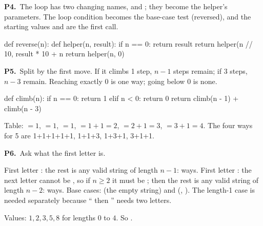 \documentclass[10pt]{scrartcl}
\begin{document}
\begin{prob}\textbf{P4.}\ The loop has two changing names,  and ; they become the helper's parameters. The loop condition  becomes the base-case test (reversed), and the starting values  and  are the first call.
\begin{py}
def reverse(n):
    def helper(n, result):
        if n == 0:
            return result
        return helper(n // 10, result * 10 + n %
    return helper(n, 0)
\end{py}
\end{prob}

\begin{prob}\textbf{P5.}\ Split by the first move. If it climbs 1 step, $n-1$ steps remain; if 3 steps, $n-3$ remain. Reaching exactly 0 is one way; going below 0 is none.
\begin{py}
def climb(n):
    if n == 0:
        return 1
    elif n < 0:
        return 0
    return climb(n - 1) + climb(n - 3)
\end{py}
Table: $=1$, $=1$, $=1$, $=1+1=2$, $=2+1=3$, $=3+1=4$. The four ways for 5 are 1+1+1+1+1, 1+1+3, 1+3+1, 3+1+1.
\end{prob}

\begin{prob}\textbf{P6.}\ Ask what the first letter is.
\begin{steps}
  \ii First letter : the rest is any valid string of length $n-1$:  ways.
  \ii First letter : the next letter cannot be , so if $n\ge2$ it must be ; then the rest is any valid string of length $n-2$:  ways.
  \ii Base cases:  (the empty string) and  (, ). The length-1 case is needed separately because `` then '' needs two letters.
\end{steps}
Values: $1, 2, 3, 5, 8$ for lengths $0$ to $4$. So .
\end{prob}
\end{document}
